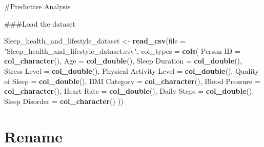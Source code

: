 \documentclass[
  11pt,
]{article}
\newenvironment{Shaded}{\begin{snugshade}}{\end{snugshade}}
\newcommand{\AttributeTok}[1]{\textcolor[rgb]{0.13,0.29,0.53}{#1}}
\newcommand{\FunctionTok}[1]{\textcolor[rgb]{0.13,0.29,0.53}{\textbf{#1}}}
\newcommand{\NormalTok}[1]{#1}
\newcommand{\OtherTok}[1]{\textcolor[rgb]{0.56,0.35,0.01}{#1}}
\newcommand{\StringTok}[1]{\textcolor[rgb]{0.31,0.60,0.02}{#1}}
\begin{document}
\#Predictive Analysis

\#\#\#Load the dataset

\begin{Shaded}
\begin{Highlighting}[]
\NormalTok{Sleep\_health\_and\_lifestyle\_dataset }\OtherTok{\textless{}{-}} \FunctionTok{read\_csv}\NormalTok{(}\AttributeTok{file =} \StringTok{"Sleep\_health\_and\_lifestyle\_dataset.csv"}\NormalTok{,}
  \AttributeTok{col\_types =} \FunctionTok{cols}\NormalTok{(}
    \StringTok{\textquotesingle{}Person ID\textquotesingle{}} \OtherTok{=} \FunctionTok{col\_character}\NormalTok{(),}
    \StringTok{\textquotesingle{}Age\textquotesingle{}} \OtherTok{=} \FunctionTok{col\_double}\NormalTok{(),}
    \StringTok{\textquotesingle{}Sleep Duration\textquotesingle{}} \OtherTok{=} \FunctionTok{col\_double}\NormalTok{(),}
    \StringTok{\textquotesingle{}Stress Level\textquotesingle{}} \OtherTok{=} \FunctionTok{col\_double}\NormalTok{(),}
    \StringTok{\textquotesingle{}Physical Activity Level\textquotesingle{}} \OtherTok{=} \FunctionTok{col\_double}\NormalTok{(),}
    \StringTok{\textquotesingle{}Quality of Sleep\textquotesingle{}} \OtherTok{=} \FunctionTok{col\_double}\NormalTok{(),}
    \StringTok{\textquotesingle{}BMI Category\textquotesingle{}} \OtherTok{=} \FunctionTok{col\_character}\NormalTok{(),}
    \StringTok{\textquotesingle{}Blood Pressure\textquotesingle{}} \OtherTok{=} \FunctionTok{col\_character}\NormalTok{(),}
    \StringTok{\textquotesingle{}Heart Rate\textquotesingle{}} \OtherTok{=} \FunctionTok{col\_double}\NormalTok{(),}
    \StringTok{\textquotesingle{}Daily Steps\textquotesingle{}} \OtherTok{=} \FunctionTok{col\_double}\NormalTok{(),}
    \StringTok{\textquotesingle{}Sleep Disorder\textquotesingle{}} \OtherTok{=} \FunctionTok{col\_character}\NormalTok{()}
\NormalTok{  ))}
\end{Highlighting}
\end{Shaded}

\hypertarget{rename}{%
\section{Rename}\label{rename}}
\end{document}
